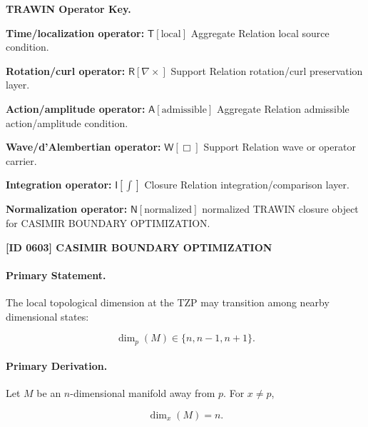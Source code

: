 \par\vspace{0.45\baselineskip}
\noindent\begin{minipage}[t]{\linewidth}
\begingroup
\small
\raggedright
\textbf{TRAWIN Operator Key.}\par
\noindent\textbf{Time/localization operator:} $\mathsf{T}\!\left[\mathrm{local}\right]$ Aggregate Relation local source condition.\par
\noindent\textbf{Rotation/curl operator:} $\mathsf{R}\!\left[\nabla\times\right]$ Support Relation rotation/curl preservation layer.\par
\noindent\textbf{Action/amplitude operator:} $\mathsf{A}\!\left[\mathrm{admissible}\right]$ Aggregate Relation admissible action/amplitude condition.\par
\noindent\textbf{Wave/d'Alembertian operator:} $\mathsf{W}\!\left[\Box\right]$ Support Relation wave or operator carrier.\par
\noindent\textbf{Integration operator:} $\mathsf{I}\!\left[\int\right]$ Closure Relation integration/comparison layer.\par
\noindent\textbf{Normalization operator:} $\mathsf{N}\!\left[\mathrm{normalized}\right]$ normalized TRAWIN closure object for CASIMIR BOUNDARY OPTIMIZATION.\par
\endgroup
\end{minipage}

\clearpage
\noindent\textbf{[ID 0603] CASIMIR BOUNDARY OPTIMIZATION}\par
\vspace{0.35em}
\paragraph{Primary Statement.}
The local topological dimension at the TZP may transition among nearby dimensional states:

\begin{equation}
\dim_p(M)\in\{n,n-1,n+1\}.
\end{equation}

\paragraph{Primary Derivation.}
Let $M$ be an $n$-dimensional manifold away from $p$. For $x\neq p$,

\begin{equation}
\dim_x(M)=n .
\end{equation}


